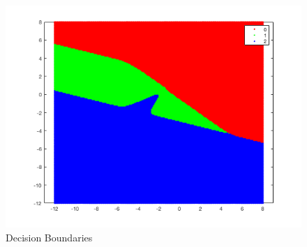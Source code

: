 \documentclass[12pt]{article}
\begin{document}
\begin{figure}[H]
\begin{center}
\includegraphics[scale=0.5]{images/boundary}
\caption{Decision Boundaries}
\label{default}
\end{center}
\end{figure}
\end{document}
